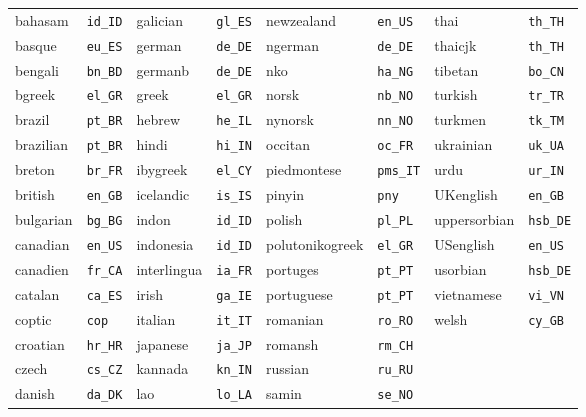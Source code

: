 \documentclass{ltxdockit}
\begin{document}
\begin{center}
\begin{tabular}{alalalal}
bahasam    & \texttt{id\_ID}  & galician    & \texttt{gl\_ES}  & newzealand      & \texttt{en\_US} &   thai            & \texttt{th\_TH}\\
basque     & \texttt{eu\_ES}  & german      & \texttt{de\_DE}  & ngerman         & \texttt{de\_DE} &   thaicjk         & \texttt{th\_TH}\\
bengali    & \texttt{bn\_BD}  & germanb     & \texttt{de\_DE}  & nko             & \texttt{ha\_NG} &   tibetan         & \texttt{bo\_CN}\\
bgreek     & \texttt{el\_GR}  & greek       & \texttt{el\_GR}  & norsk           & \texttt{nb\_NO} &   turkish         & \texttt{tr\_TR}\\
brazil     & \texttt{pt\_BR}  & hebrew      & \texttt{he\_IL}  & nynorsk         & \texttt{nn\_NO} &   turkmen         & \texttt{tk\_TM}\\
brazilian  & \texttt{pt\_BR}  & hindi       & \texttt{hi\_IN}  & occitan         & \texttt{oc\_FR} &   ukrainian       & \texttt{uk\_UA}\\
breton     & \texttt{br\_FR}  & ibygreek    & \texttt{el\_CY}  & piedmontese     & \texttt{pms\_IT} &  urdu            & \texttt{ur\_IN}\\
british    & \texttt{en\_GB}  & icelandic   & \texttt{is\_IS}  & pinyin          & \texttt{pny} &      UKenglish       & \texttt{en\_GB}\\
bulgarian  & \texttt{bg\_BG}  & indon       & \texttt{id\_ID}  & polish          & \texttt{pl\_PL} &   uppersorbian    & \texttt{hsb\_DE}\\
canadian   & \texttt{en\_US}  & indonesia   & \texttt{id\_ID}  & polutonikogreek & \texttt{el\_GR} &   USenglish       & \texttt{en\_US}\\
canadien   & \texttt{fr\_CA}  & interlingua & \texttt{ia\_FR}  & portuges        & \texttt{pt\_PT} &   usorbian        & \texttt{hsb\_DE}\\
catalan    & \texttt{ca\_ES}  & irish       & \texttt{ga\_IE}  & portuguese      & \texttt{pt\_PT} &   vietnamese      & \texttt{vi\_VN}\\
coptic     & \texttt{cop}     & italian     & \texttt{it\_IT}  & romanian        & \texttt{ro\_RO} &   welsh           & \texttt{cy\_GB}\\
croatian   & \texttt{hr\_HR}  & japanese    & \texttt{ja\_JP}  & romansh         & \texttt{rm\_CH}\\
czech      & \texttt{cs\_CZ}  & kannada     & \texttt{kn\_IN}  & russian         & \texttt{ru\_RU}\\
danish     & \texttt{da\_DK}  & lao         & \texttt{lo\_LA}  & samin           & \texttt{se\_NO}\\
\bottomrule
\end{tabular}
\end{center}
\end{document}
